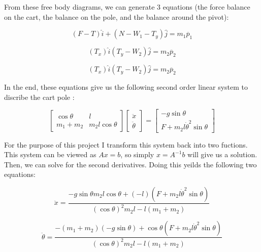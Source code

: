 \documentclass[12pt]{article}
\begin{document}
From these free body diagrams, we can generate 3 equations (the force balance on the cart,
the balance on the pole, and the balance around the pivot):

\begin{equation} \label{eq:1}
(F - T) \hat{i} + (N - W_1 - T_y) \hat{j} = m_1 \ddot{p_1}
\end{equation}

\begin{equation} \label{eq:2}
(T_x) \hat{i} (T_y - W_2 ) \hat{j} = m_2  \ddot{p_2}
\end{equation}

\begin{equation} \label{eq:3}
(T_x) \hat{i} (T_y - W_2 ) \hat{j} = m_2  \ddot{p_2}
\end{equation}

In the end, these equations give us the following second order linear system to
discribe the cart pole \cite{mattkelly} \cite{underactuated}:

\begin{equation} \label{eq:4}
\begin{bmatrix}
\cos \theta & l \\
m_1 + m_2 & m_2 l \cos \theta
\end{bmatrix}
\begin{bmatrix}
\ddot{x} \\
\ddot{\theta}
\end{bmatrix}
=
\begin{bmatrix}
- g \sin \theta \\
F + m_2 l \dot{\theta}^2 \sin \theta
\end{bmatrix}
\end{equation}

For the purpose of this project I transform this system back into two fuctions.
This system can be viewed as $A x = b$, so simply $x = A^{-1} b$ will give us
a solution. Then, we can solve for the second derivatives. Doing this yeilds the following
two equations:

\begin{equation} \label{eq:5}
\ddot{x} = \frac{-g \sin \theta m_2 l \cos \theta + (-l)(F + m_2 l \dot{\theta}^2 \sin \theta) }{ (\cos \theta)^2 m_2 l - l(m_1 + m_2) }
\end{equation}

\begin{equation} \label{eq:6}
\ddot{\theta} = \frac{-(m_1 + m_2)(-g \sin \theta) + \cos \theta (F + m_2 l \dot{\theta}^2 \sin \theta) }{ (\cos \theta)^2 m_2 l - l(m_1 + m_2) }
\end{equation}
\end{document}
